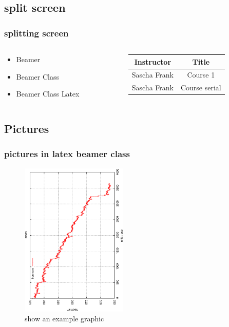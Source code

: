 \documentclass{beamer}
\begin{document}
\subsection{split screen}

\begin{frame}\frametitle{splitting screen}
  \begin{columns}
    \begin{column}{4cm}
      \begin{itemize}
        \item Beamer
        \item Beamer Class
        \item Beamer Class Latex
      \end{itemize}
    \end{column}
    \begin{column}{5cm}
      \begin{tabular}{|c|c|}
        \hline
        \textbf{Instructor} & \textbf{Title} \\
        \hline
        Sascha Frank &  Course 1 \\
        \hline
        Sascha Frank &  Course serial  \\
        \hline
      \end{tabular}
    \end{column}
  \end{columns}
\end{frame}

\subsection{Pictures}

\begin{frame}\frametitle{pictures in latex beamer class}
  \begin{figure}
    \includegraphics[width=2in, angle=-90]{figs/PIC1}
    \caption{show an example graphic}
  \end{figure}
\end{frame}
\end{document}
